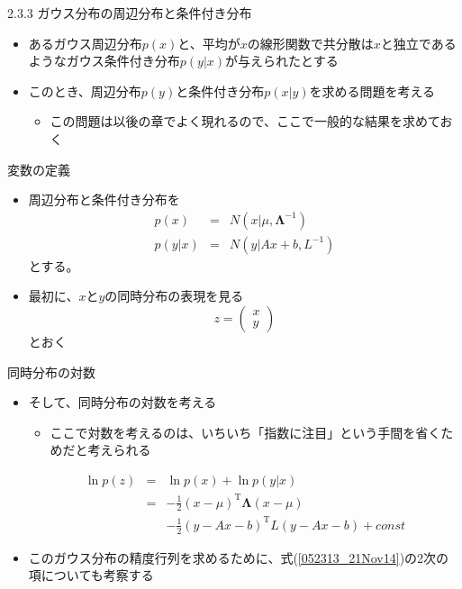\begin{frame}{2.3.3 ガウス分布の周辺分布と条件付き分布}
 \begin{itemize}
  \item あるガウス周辺分布$p(x)$と、平均が$x$の線形関数で共分散は$x$と独立であるようなガウス条件付き分布$p(y|x)$が与えられたとする
  \item このとき、周辺分布$p(y)$と条件付き分布$p(x|y)$を求める問題を考える
        \begin{itemize}
         \item この問題は以後の章でよく現れるので、ここで一般的な結果を求めておく
        \end{itemize}
 \end{itemize}
\end{frame}

\begin{frame}{変数の定義}
 \begin{itemize}
  \item 周辺分布と条件付き分布を
        \begin{eqnarray}
         p(x) &=& N(x|\mu , \bm{\Lambda}^{-1})\\
         p(y|x) &=& N(y|Ax+b, L^{-1})
        \end{eqnarray}
        とする。
  \item 最初に、$x$と$y$の同時分布の表現を見る
        \begin{equation}
         z = \begin{pmatrix}
              x \\
              y
             \end{pmatrix}
        \end{equation}
        とおく
 \end{itemize}
\end{frame}

\begin{frame}{同時分布の対数}
 \begin{itemize}
  \item そして、同時分布の対数を考える
  \begin{itemize}
   \item ここで対数を考えるのは、いちいち「指数に注目」という手間を省くためだと考えられる
  \end{itemize}
        \begin{eqnarray}
         \ln p(z) &=& \ln p(x) + \ln p(y|x) \nonumber \\
         &= & -\frac{1}{2}(x-\mu)^{\mathrm{T}}\bm{\Lambda}(x-\mu) \nonumber \\
         &&-\frac{1}{2}(y-Ax-b)^{\mathrm{T}}L(y-Ax-b)+const\label{052313_21Nov14}
        \end{eqnarray}
  \item このガウス分布の精度行列を求めるために、式(\ref{052313_21Nov14})の2次の項についても考察する
 \end{itemize}
\end{frame}


